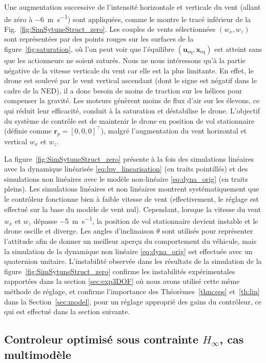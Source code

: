 Une augmentation successive de l'intensité horizontale et verticale du vent (allant de zéro à \SI{-6}{\meter\per\second}) sont appliquées, comme le montre le tracé inférieur de la Fig.~\ref{fig:SimSytuneStruct_zero}. Les couples de vents sélectionnées $(w_{x}, w_{z})$ sont représentées par des points rouges sur les surfaces de la figure~\ref{fig:saturation}, où l'on peut voir que l'équilibre $(\boldsymbol{u}_{\text{eq}}, \boldsymbol{x}_{\text{eq}})$ est atteint sans que les actionneurs ne soient saturés. Nous ne nous intéressons qu'à la partie négative de la vitesse verticale du vent car elle est la plus limitante. En effet, le drone est soulevé par le vent vertical ascendant (dont le signe est négatif dans le cadre de la NED), il a donc besoin de moins de traction sur les hélices pour compenser la gravité. Les moteurs génèrent moins de flux d'air sur les élevons, ce qui réduit leur efficacité, conduit à la saturation et déstabilise le drone.
L'objectif du système de contrôle est de maintenir le drone en position de vol stationnaire (définie comme $\boldsymbol{r}_{p} = [0,0,0]^\top$), malgré l'augmentation du vent horizontal et vertical $w_{x}$ et $w_{z}$. 


La figure~\ref{fig:SimSytuneStruct_zero} présente à la fois des simulations linéaires avec la dynamique linéarisée \eqref{eq:lpv_linearisation} (en traits pointillés) et des simulations non linéaires avec le modèle non-linéaire \eqref{eq:dyna_orig} (en traits pleins). Les simulations linéaires et non linéaires montrent systématiquement que le contrôleur fonctionne bien à faible vitesse de vent (effectivement, le réglage est effectué sur la base du modèle de vent nul). Cependant, lorsque la vitesse du vent $w_{x}$ et $w_{z}$ dépasse \SI{-5}{\meter\per\second}, la position de vol stationnaire devient instable et le drone oscille et diverge. Les angles d'inclinaison $\theta$ sont utilisés pour représenter l'attitude afin de donner un meilleur aperçu du comportement du véhicule, mais la simulation de la dynamique non linéaire \eqref{eq:dyna_orig} est effectuée avec un quaternion unitaire. L'instabilité observée dans les résultats de la simulation de la figure~\ref{fig:SimSytuneStruct_zero} confirme les instabilités expérimentales rapportées dans la section \ref{sec:exp3DOF} où nous avons utilisé cette même méthode de réglage, et confirme l'importance des Théorèmes~\ref{thm:eqs} et~\ref{th:lin} dans la Section~\ref{sec:model}, pour un réglage approprié des gains du contrôleur, ce qui est effectué dans la section suivante.


\subsection{\texorpdfstring{Controleur optimisé sous contrainte $H_{\infty}$}{H {infty}}, cas multimodèle}
\label{sec:h_inf6DOF_multi}

